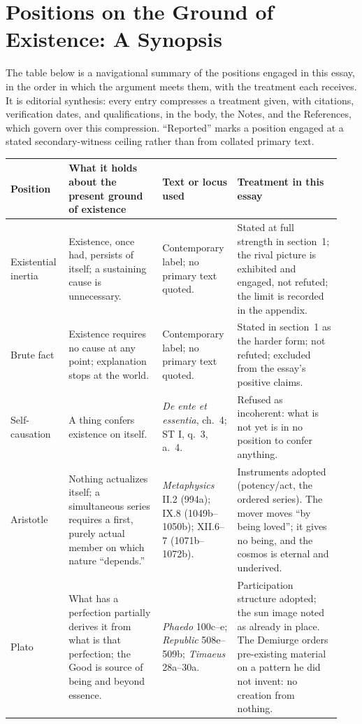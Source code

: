 \section{Positions on the Ground of Existence: A Synopsis}

The table below is a navigational summary of the positions engaged in this essay, in the order in which the argument meets them, with the treatment each receives. It is editorial synthesis: every entry compresses a treatment given, with citations, verification dates, and qualifications, in the body, the Notes, and the References, which govern over this compression. ``Reported'' marks a position engaged at a stated secondary-witness ceiling rather than from collated primary text.

\begingroup
\renewcommand{\arraystretch}{1.24}
\footnotesize
\begin{longtable}{>{\raggedright\arraybackslash}p{0.155\linewidth}>{\raggedright\arraybackslash}p{0.275\linewidth}>{\raggedright\arraybackslash}p{0.215\linewidth}>{\raggedright\arraybackslash}p{0.30\linewidth}}
\toprule
\textbf{Position} & \textbf{What it holds about the present ground of existence} & \textbf{Text or locus used} & \textbf{Treatment in this essay}\\
\midrule
\endhead
\bottomrule
\endfoot
Existential inertia & Existence, once had, persists of itself; a sustaining cause is unnecessary. & Contemporary label; no primary text quoted. & Stated at full strength in section~1; the rival picture is exhibited and engaged, not refuted; the limit is recorded in the appendix.\\
Brute fact & Existence requires no cause at any point; explanation stops at the world. & Contemporary label; no primary text quoted. & Stated in section~1 as the harder form; not refuted; excluded from the essay's positive claims.\\
Self-causation & A thing confers existence on itself. & \emph{De ente et essentia}, ch.~4; ST I, q.~3, a.~4. & Refused as incoherent: what is not yet is in no position to confer anything.\\
Aristotle & Nothing actualizes itself; a simultaneous series requires a first, purely actual member on which nature ``depends.'' & \emph{Metaphysics} II.2 (994a); IX.8 (1049b--1050b); XII.6--7 (1071b--1072b). & Instruments adopted (potency/act, the ordered series). The mover moves ``by being loved''; it gives no being, and the cosmos is eternal and underived.\\
Plato & What has a perfection partially derives it from what is that perfection; the Good is source of being and beyond essence. & \emph{Phaedo} 100c--e; \emph{Republic} 508e--509b; \emph{Timaeus} 28a--30a. & Participation structure adopted; the sun image noted as already in place. The Demiurge orders pre-existing material on a pattern he did not invent: no creation from nothing.\\

\end{longtable}

